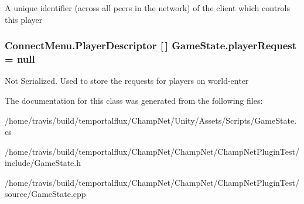 A unique identifier (across all peers in the network) of the client which controls this player 

\hypertarget{class_game_state_a8b1949523ac8e40776c0617666023d64}{
\subsubsection[{player\-Request}]{\setlength{\rightskip}{0pt plus 5cm}Connect\-Menu.\-Player\-Descriptor \mbox{[}$\,$\mbox{]} Game\-State.\-player\-Request = null}}\label{class_game_state_a8b1949523ac8e40776c0617666023d64}


Not Serialized. Used to store the requests for players on world-\/enter 



The documentation for this class was generated from the following files\-:\begin{DoxyCompactItemize}
\item 
/home/travis/build/temportalflux/\-Champ\-Net/\-Unity/\-Assets/\-Scripts/Game\-State.\-cs\item 
/home/travis/build/temportalflux/\-Champ\-Net/\-Champ\-Net/\-Champ\-Net\-Plugin\-Test/include/Game\-State.\-h\item 
/home/travis/build/temportalflux/\-Champ\-Net/\-Champ\-Net/\-Champ\-Net\-Plugin\-Test/source/Game\-State.\-cpp\end{DoxyCompactItemize}
